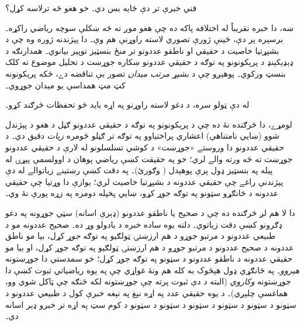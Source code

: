 \documentclass[../../../include/open-logic-section]{subfiles}
\begin{document}

فني خبرې تر دې ځايه بس دي۔ خو هغو څه ترلاسه کړل؟

ښه، دا خبره تقريباً له اختلافه پاکه ده چې هغو موږ ته څه {ښکلې}
سوچه رياضي راکړه۔ برسېره پر دې، ځينې ژورې تصوري لاسته راوړنې هم
وې۔ دا پېژندنه ژوره وه چې د بشپړتيا خاصيت د حقيقي او ناطقو عددونو
تر منځ بنسټيز توپير بيانوي۔ همدارنګه د ډېډېکېنډ د پرېکونونو په توګه
د حقيقي عددونو ښکاره جوړښت د تحليل موضوع ته کلک بنسټ ورکوي۔ پوهېږو
چې د \emph{بشپړ مرتب ميدان} تصور بې تناقضه دے، ځکه پرېکونونه کټ
مټ همداسې يو ميدان جوړوي۔

له دې ټولو سره، د دغو لاسته راوړنو په اړه بايد څو تحفظات څرګند کړو۔

لومړے، دا څرګنده نۀ ده چې د پرېکونونو په توګه د حقيقي عددونو ګڼل
د هغو د پېژندل شوو (ښايي نامتناهي) اعشاري پراختياوو په توګه تر ګڼلو
څومره \emph{زيات} دقيق دي۔ د حقيقي عددونو دا وروستے «جوړښت» د
کوشي تسلسلونو له لارې د حقيقي عددونو جوړښت ته څه ورته والے لري؛ خو
په حقيقت کښې رياضي پوهان د اوولسمې پېړۍ له پيله په بنسټيز ډول پرې
پوهېدل ( وګورئ)۔ په دقت کښې رښتينے زياتوالے له
دې پېژندنې راغے چې حقيقي عددونه د بشپړتيا خاصيت لري؛ يوازې دا وړتيا
چې حقيقي عددونه د ځانګړو سټونو په توګه جوړ کړو، ښايي پخپله دومره
په زړه پورې نۀ وي۔

دا لا هم لږ څرګنده ده چې د صحيح يا ناطقو عددونو (ډېرې اسانه) سټي
جوړونه په دغو ډګرونو کښې دقت زياتوي۔ دلته يوه ساده خبره د يادولو وړ
ده۔ صحيح عددونه مو د طبيعي عددونو د مرتبو جوړو د هم ارزښتۍ ټولګيو
په توګه \emph{جوړ} کړل، بيا مو ناطق عددونه د صحيح عددونو د مرتبو
جوړو د هم ارزښتۍ ټولګيو په توګه جوړ کړل، او بيا مو حقيقي عددونه د
ناطقو عددونو د سټونو په توګه جوړ کړل؛ خو سمدستي دا جوړښتونه
\emph{هېروو}۔ په ځانګړي ډول هېڅوک به کله هم ونۀ غواړي چې په يوه
رياضياتي ثبوت کښې دا جوړښتونه \emph{وکاروي} (البته د دې ثبوت پرته
چې جوړښتونه لکه څنګه چې ټاکل شوي وو، هماغسې چلېږي)۔ د يوه حقيقي
عدد په اړه نېغ په نېغه خبرې کول د طبيعي عددونو د سټونو د سټونو د
سټونو د سټونو د سټونو د سټونو د کوم سټ په اړه تر خبرو ډېر اسانه دي۔
%
%
%
	
\end{document}
